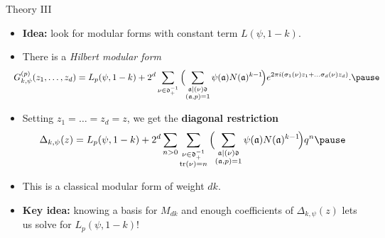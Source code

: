 \documentclass[10pt]{beamer}
\def\acts{\mathrel{\reflectbox{$\righttoleftarrow$}}}
\let\mf\mathfrak
\newcommand{\C}{\mathbb{C}}
\renewcommand{\O}{\mathscr{O}}
\DeclareMathOperator{\Sl}{Sl}
\begin{document}
\begin{frame}{Theory III}
\begin{itemize}[leftmargin=-3pt]
\item \textbf{Idea:} look for modular forms with constant term $L(\psi,1-k)$.\pause
\item There is a \emph{Hilbert modular form}
  \[ \hspace{-10pt}G_{k,\psi}^{(p)}(z_{1},\ldots, z_{d}) = L_{p}(\psi,1-k) + 2^{d}\sum_{\nu \in \mf
      d^{-1}_{+}}\Big(\!\sum_{\substack{\mf a \mid (\nu)\mf d \\ (\mf a, p) =
        1}}\psi(\mf a)N(\mf a)^{k-1}\!\Big)e^{2\pi i (\sigma_{1}(\nu)z_{1} + \ldots
      \sigma_{d}(\nu)z_{d})}. \pause
  \]
  

\item Setting $z_{1} = \ldots = z_{d} = z$, we get the \textbf{diagonal restriction}
  \[\Delta_{k,\psi}(z) = L_{p}(\psi,1-k) + 2^{d}\sum_{n>0}\sum_{\substack{ \nu \in \mf
      d^{-1}_{+}\\ \tr(\nu) = n}}\Big(\!\sum_{\substack{\mf a \mid (\nu)\mf d \\ (\mf a, p) =
        1}}\psi(\mf a)N(\mf a)^{k-1}\!\Big)q^{n}\pause
  \]
\item This is a classical modular form of weight $dk$. \pause
\item \textbf{Key idea:} knowing a basis for $M_{dk}$ and enough coefficients of
  $\Delta_{k,\psi}(z)$ lets us solve for $L_{p}(\psi,1-k)$!
\end{itemize}

\end{frame}
\end{document}
